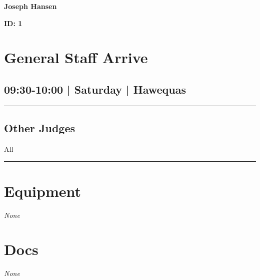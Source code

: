 \documentclass[10pt, A5]{article}
\newcommand{\newtitle}[1]{\begin{center}{\Huge\bfseries #1 }\\ \vspace{5mm}\end{center}}
\newcommand{\newsubtitle}[1]{\begin{center}{\color{grey}\Large\bfseries #1 }\\ \vspace{5mm}\end{center}}
\begin{document}
		\newtitle{Joseph Hansen}
	\newsubtitle{ID: 1}


        \begin{framed}
        \begin{minipage}{\textwidth}

        \setcounter{section}{2}
        \section{General Staff Arrive}
        \subsection*{09:30-10:00 | Saturday | Hawequas}

        \vspace{0.25cm}
        \hrule
        \vspace{0.25cm}


        \subsection*{Other Judges}
                    All

            \vspace{0.25cm}
        \hrule
        \vspace{0.25cm}

        \begin{multicols}{2}

		\section*{\faWrench \: Equipment}

				\textit{None}
		
		\vfill\null
		\columnbreak

			\section*{\faFile \: Docs}
		 	\textit{None}
	

		\vfill\null

		\end{multicols}
\end{minipage}
\end{framed}
\end{document}
